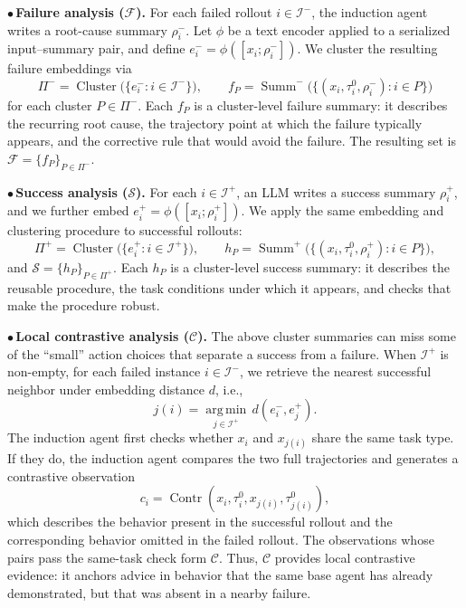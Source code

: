 \documentclass{article}
\begin{document}
\noindent$\bullet$\,\textbf{Failure analysis ($\mathcal{F}$).}
For each failed rollout $i\in\mathcal{I}^{-}$, the induction agent writes a root-cause summary $\rho_i^{-}$.
Let $\phi$ be a text encoder applied to a serialized input--summary pair, and define $e_i^{-}=\phi([x_i;\rho_i^{-}])$.
We cluster the resulting failure embeddings via
\begin{equation}
    \Pi^{-}=\operatorname{Cluster}\big(\{e_i^{-}:i\in\mathcal{I}^{-}\}\big),
    \qquad
    f_P=\operatorname{Summ}^{-}\big(\{(x_i,\tau_i^{0},\rho_i^{-}):i\in P\}\big)
\end{equation}
for each cluster $P\in\Pi^{-}$.
Each $f_P$ is a cluster-level failure summary: it describes the recurring root cause, the trajectory point at which the failure typically appears, and the corrective rule that would avoid the failure.
The resulting set is $\mathcal{F}=\{f_P\}_{P\in\Pi^{-}}$.

\noindent$\bullet$\,\textbf{Success analysis ($\mathcal{S}$).}
For each $i\in\mathcal{I}^{+}$, an LLM writes a success summary $\rho_i^{+}$, and we further embed $e_i^{+}=\phi([x_i;\rho_i^{+}])$.
We apply the same embedding and clustering procedure to successful rollouts:
\begin{equation}
    \Pi^{+}=\operatorname{Cluster}\big(\{e_i^{+}:i\in\mathcal{I}^{+}\}\big),
    \qquad
    h_P=\operatorname{Summ}^{+}\big(\{(x_i,\tau_i^{0},\rho_i^{+}):i\in P\}\big),
\end{equation}
and $\mathcal{S}=\{h_P\}_{P\in\Pi^{+}}$.
Each $h_P$ is a cluster-level success summary: it describes the reusable procedure, the task conditions under which it appears, and checks that make the procedure robust.

\noindent$\bullet$\,\textbf{Local contrastive analysis ($\mathcal{C}$).}
The above cluster summaries can miss some of the ``small'' action choices that separate a success from a failure.
When $\mathcal{I}^{+}$ is non-empty, for each failed instance $i\in\mathcal{I}^{-}$, we retrieve the nearest successful neighbor under embedding distance $d$, i.e.,
\begin{equation}
    j(i)=\operatorname*{arg\,min}_{j\in\mathcal{I}^{+}}\,d(e_i^{-},e_j^{+}).
\end{equation}
The induction agent first checks whether $x_i$ and $x_{j(i)}$ share the same task type.
If they do, the induction agent compares the two full trajectories and generates a contrastive observation
\[
    c_i=\operatorname{Contr}(x_i,\tau_i^{0},x_{j(i)},\tau_{j(i)}^{0}),
\]
which describes the behavior present in the successful rollout and the corresponding behavior omitted in the failed rollout. The observations whose pairs pass the same-task check form $\mathcal{C}$.
Thus, $\mathcal{C}$ provides local contrastive evidence: it anchors advice in behavior that the same base agent has already demonstrated, but that was absent in a nearby failure.
\end{document}

